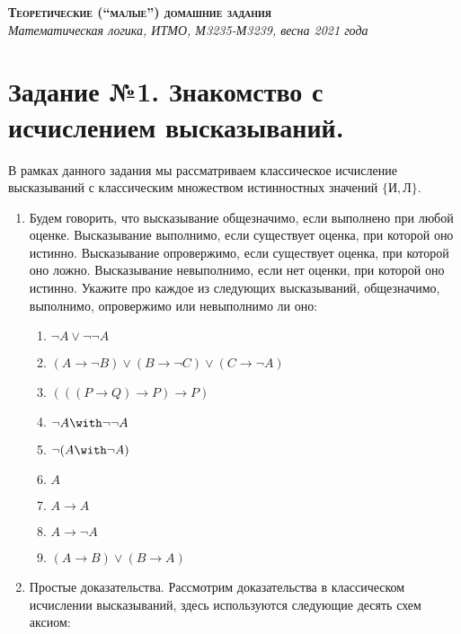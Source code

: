 \documentclass[10pt,a4paper,oneside]{article}
\begin{document}
\begin{center}{\Large\textsc{\textbf{Теоретические (``малые'') домашние задания}}}\\
             \it Математическая логика, ИТМО, М3235-М3239, весна 2021 года\end{center}

\section*{Задание №1. Знакомство с исчислением высказываний.}

В рамках данного задания мы рассматриваем классическое исчисление высказываний с классическим
множеством истинностных значений $\{\text{И}, \text{Л}\}$.

\begin{enumerate}

\item Будем говорить, что высказывание общезначимо, если выполнено при любой оценке.
    Высказывание выполнимо, если существует оценка, при которой оно истинно.
    Высказывание опровержимо, если существует оценка, при которой оно ложно.
    Высказывание невыполнимо, если нет оценки, при которой оно истинно.
     Укажите про каждое из следующих высказываний, общезначимо, выполнимо, опровержимо или невыполнимо ли оно:
\begin{enumerate}
\item $\neg A\vee\neg\neg A$
\item $(A\rightarrow\neg B)\vee(B\rightarrow\neg C)\vee(C\rightarrow\neg A)$
\item $(((P\rightarrow Q)\rightarrow P)\rightarrow P)$
\item $\neg A \with \neg \neg A$
\item $\neg (A \with \neg A)$
\item $A$
\item $A \rightarrow A$
\item $A \rightarrow \neg A$
\item $(A \rightarrow B) \vee (B \rightarrow A)$
\end{enumerate}

\item Простые доказательства. Рассмотрим доказательства в классическом исчислении
высказываний, здесь используются следующие десять схем аксиом:


\end{enumerate}
\end{document}
